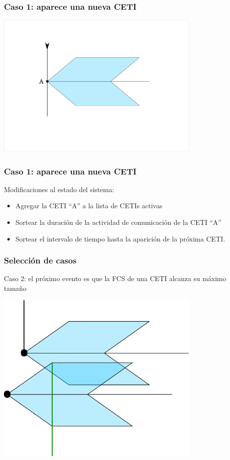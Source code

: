 \documentclass[handout]{beamer}
\theoremstyle{plain}
\theoremstyle{definition}
\theoremstyle{remark}
\begin{document}
\begin{frame}\frametitle{Caso 1: aparece una nueva CETI}
   \centering
   \includegraphics[width=0.75\textwidth]{C1.png}
\end{frame}  %

\begin{frame}\frametitle{Caso 1: aparece una nueva CETI}

   Modificaciones al estado del sistema:
   \begin{itemize}
      \item Agregar la CETI ``A'' a la lista de CETIs activas
      \item Sortear la duración de la actividad de comunicación de la
         CETI ``A''
      \item Sortear el intervalo de tiempo hasta la aparición de la
         próxima CETI.
   \end{itemize}

\end{frame}  %
 



 
\begin{frame}\frametitle{Selección de casos}
   Caso 2: el próximo evento es que la FCS de una CETI alcanza su
   máximo tamaño
   \bigskip

\centering
\includegraphics[width=0.75\textwidth]{path5908-5-8.png}
\end{frame}
 
\end{document}
